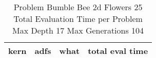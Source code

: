 \begin{table}[H]
\caption{Problem  Bumble Bee 2d  Flowers 25\\Total Evaluation Time per Problem \\ Max Depth 17 Max Generations 104\\}
\begin{center}
\scalebox{1.0} %
{
\begin{tabular}{lllr}
\hline
kern & adfs & what & total eval time \\
\hline


\end{tabular}
}
\end{center}
\end{table}

